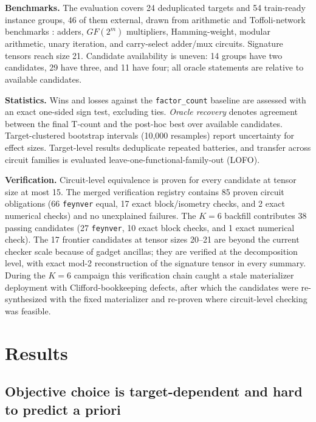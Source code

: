 \documentclass{cbctq}
\begin{document}
\textbf{Benchmarks.} The evaluation covers 24 deduplicated targets and 54 train-ready instance groups, 46 of them external, drawn from arithmetic and Toffoli-network benchmarks \cite{amy2014,heyfron2018}: adders, $GF(2^m)$ multipliers, Hamming-weight, modular arithmetic, unary iteration, and carry-select adder/mux circuits. Signature tensors reach size 21. Candidate availability is uneven: 14 groups have two candidates, 29 have three, and 11 have four; all oracle statements are relative to available candidates.

\textbf{Statistics.} Wins and losses against the \texttt{factor\_count} baseline are assessed with an exact one-sided sign test, excluding ties. \emph{Oracle recovery} denotes agreement between the final T-count and the post-hoc best over available candidates. Target-clustered bootstrap intervals (10{,}000 resamples) report uncertainty for effect sizes. Target-level results deduplicate repeated batteries, and transfer across circuit families is evaluated leave-one-functional-family-out (LOFO).

\textbf{Verification.} Circuit-level equivalence is proven for every candidate at tensor size at most 15. The merged verification registry contains 85 proven circuit obligations (66 \texttt{feynver} equal, 17 exact block/isometry checks, and 2 exact numerical checks) and no unexplained failures. The $K=6$ backfill contributes 38 passing candidates (27 \texttt{feynver}, 10 exact block checks, and 1 exact numerical check). The 17 frontier candidates at tensor sizes 20--21 are beyond the current checker scale because of gadget ancillas; they are verified at the decomposition level, with exact mod-2 reconstruction of the signature tensor in every summary. During the $K=6$ campaign this verification chain caught a stale materializer deployment with Clifford-bookkeeping defects, after which the candidates were re-synthesized with the fixed materializer and re-proven where circuit-level checking was feasible.

\section{Results}

\subsection{Objective choice is target-dependent and hard to predict a priori}
\end{document}
